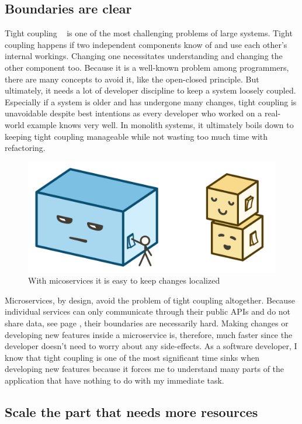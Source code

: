 \subsection{Boundaries are clear}

Tight coupling ~\cite{kaye.2003} is one of the most challenging problems of large systems. Tight coupling happens if two independent components know of and use each other's internal workings. Changing one necessitates understanding and changing the other component too. Because it is a well-known problem among programmers, there are many concepts to avoid it, like the open-closed principle. But ultimately, it needs a lot of developer discipline to keep a system loosely coupled. Especially if a system is older and has undergone many changes, tight coupling is unavoidable despite best intentions as every developer who worked on a real-world example knows very well. In monolith systems, it ultimately boils down to keeping tight coupling manageable while not wasting too much time with refactoring.

\begin{figure}[ht]
  \centering
  \includegraphics[width=0.55\linewidth]{assets/illustration-setting.png}
  \caption{With micoservices it is easy to keep changes localized}
\end{figure}

Microservices, by design, avoid the problem of tight coupling altogether. Because individual services can only communicate through their public APIs and do not share data, see page \pageref{sec:theory:decentralized-data}, their boundaries are necessarily hard. Making changes or developing new features inside a microservice is, therefore, much faster since the developer doesn't need to worry about any side-effects. As a software developer, I know that tight coupling is one of the most significant time sinks when developing new features because it forces me to understand many parts of the application that have nothing to do with my immediate task.


\subsection{Scale the part that needs more resources}




